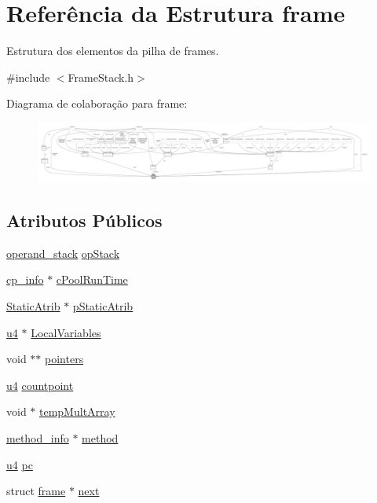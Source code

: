 \hypertarget{structframe}{}\section{Referência da Estrutura frame}
\label{structframe}


Estrutura dos elementos da pilha de frames.  




{\ttfamily \#include $<$Frame\+Stack.\+h$>$}



Diagrama de colaboração para frame\+:\nopagebreak
\begin{figure}[H]
\begin{center}
\leavevmode
\includegraphics[width=350pt]{structframe__coll__graph}
\end{center}
\end{figure}
\subsection*{Atributos Públicos}
\begin{DoxyCompactItemize}
\item 
\hyperlink{structoperand__stack}{operand\+\_\+stack} \hyperlink{structframe_ac87e8a50c7f6d37600c44c1faca0f530}{op\+Stack}
\item 
\hyperlink{structcp__info}{cp\+\_\+info} $\ast$ \hyperlink{structframe_af9ce330bb6f6e4d7b2a5fb046f08e4dc}{c\+Pool\+Run\+Time}
\item 
\hyperlink{structStaticAtrib}{Static\+Atrib} $\ast$ \hyperlink{structframe_adf21113594c388521fe0f3591241f597}{p\+Static\+Atrib}
\item 
\hyperlink{ClassLoader_8h_aedf6ddc03df8caaaccbb4c60b9a9b850}{u4} $\ast$ \hyperlink{structframe_a1c91e0ecde5fe1fee5bf295f096b511f}{Local\+Variables}
\item 
void $\ast$$\ast$ \hyperlink{structframe_a29911524013a45af719b6d19592dc60d}{pointers}
\item 
\hyperlink{ClassLoader_8h_aedf6ddc03df8caaaccbb4c60b9a9b850}{u4} \hyperlink{structframe_aa4ce8c8307208f3fdf27b5a81fc265af}{countpoint}
\item 
void $\ast$ \hyperlink{structframe_ae25d34f063809e9990a1279fa9a794f4}{temp\+Mult\+Array}
\item 
\hyperlink{structmethod__info}{method\+\_\+info} $\ast$ \hyperlink{structframe_a2fac8190b89a1cf94c23628f1849a939}{method}
\item 
\hyperlink{ClassLoader_8h_aedf6ddc03df8caaaccbb4c60b9a9b850}{u4} \hyperlink{structframe_ae2f8c8d0abb0ff0952fb8ab971c2d3d0}{pc}
\item 
struct \hyperlink{structframe}{frame} $\ast$ \hyperlink{structframe_a23c908c0892e1329c82f3673e1d659eb}{next}
\end{DoxyCompactItemize}


